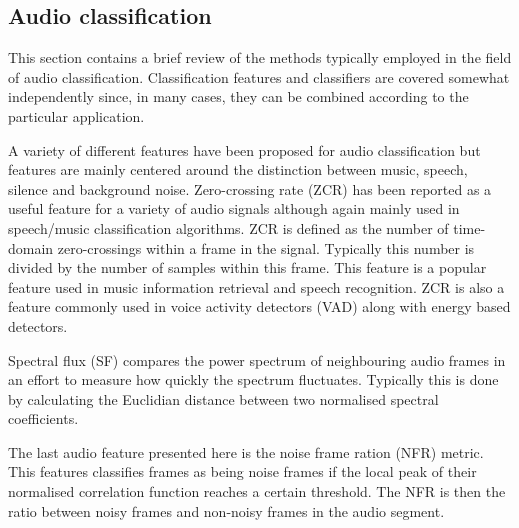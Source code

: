 %

\subsection{Audio classification}
This section contains a brief review of the methods typically employed in the field of audio classification. Classification features and classifiers are covered somewhat independently since, in many cases, they can be combined according to the particular application.

A variety of different features have been proposed for audio classification but features are mainly centered around the distinction between music, speech, silence and background noise. Zero-crossing rate (ZCR) has been reported as a useful feature for a variety of audio signals although again mainly used in speech/music classification algorithms\cite{Lu2002}. ZCR is defined as the number of time-domain zero-crossings within a frame in the signal. Typically this number is divided by the number of samples within this frame. This feature is a popular feature used in music information retrieval and speech recognition\cite{Saraceno1997}\cite{Scheirer1997}\cite{Gouyon2000}. ZCR is also a feature commonly used in voice activity detectors (VAD) along with energy based detectors\cite{Sangwan2002}.

Spectral flux (SF) compares the power spectrum of neighbouring audio frames in an effort to measure how quickly the spectrum fluctuates. Typically this is done by calculating the Euclidian distance between two normalised spectral coefficients\cite{Wang2012}.

The last audio feature presented here is the noise frame ration (NFR) metric. This features classifies frames as being noise frames if the local peak of their normalised correlation function reaches a certain threshold. The NFR is then the ratio between noisy frames and non-noisy frames in the audio segment\cite{Lu2002}\cite{Jiang2000}.

